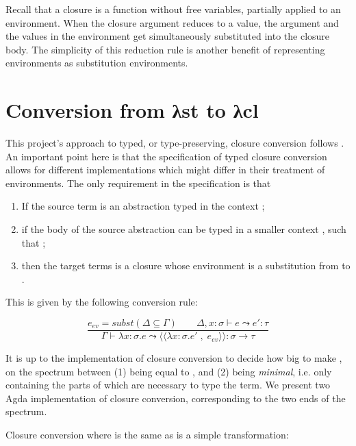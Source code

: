 \documentclass[bsc,frontabs,oneside,singlespacing,parskip,deptreport]{infthesis}
\theoremstyle{definition}
\theoremstyle{lemma}
\begin{document}

Recall that a closure is a function without free variables,
partially applied to an environment. When the closure argument reduces
to a value, the argument and the values in the environment get
simultaneously substituted into the closure body. The simplicity of
this reduction rule is another benefit of representing environments as
substitution environments.

\section{Conversion from λst to λcl}
\label{sec:conversion-from-st}

This project's approach to typed, or type-preserving, closure
conversion follows \cite{DBLP:conf/popl/MinamideMH96}. An important
point here is that the specification of typed closure conversion
allows for different implementations which might differ in their
treatment of environments. The only requirement in the specification
is that

\begin{enumerate}
\item If the source term is an abstraction typed in the context
  ;
\item if the body of the source abstraction can be typed in a smaller
  context , such that ;
\item then the target terms is a closure whose environment is a
  substitution from  to .
\end{enumerate}

This is given by the following conversion rule:

\[
  \frac
  {e_{ev} = subst (\Delta \subseteq \Gamma) \quad \quad \Delta , x : \sigma \vdash e \leadsto e' : \tau }
  {\Gamma \vdash \lambda x : \sigma . e \leadsto
    \langle\langle \lambda x : \sigma . e' \; , \; e_{ev} \rangle\rangle : \sigma \rightarrow \tau}
\]

It is up to the implementation of closure conversion to decide how big
to make , on the spectrum between (1)  being equal to
, and (2)  being \textit{minimal}, i.e. only containing
the parts of  which are necessary to type the term. We present
two Agda implementation of closure conversion, corresponding to the
two ends of the spectrum.

Closure conversion where  is the same as  is a simple
transformation:
\end{document}
